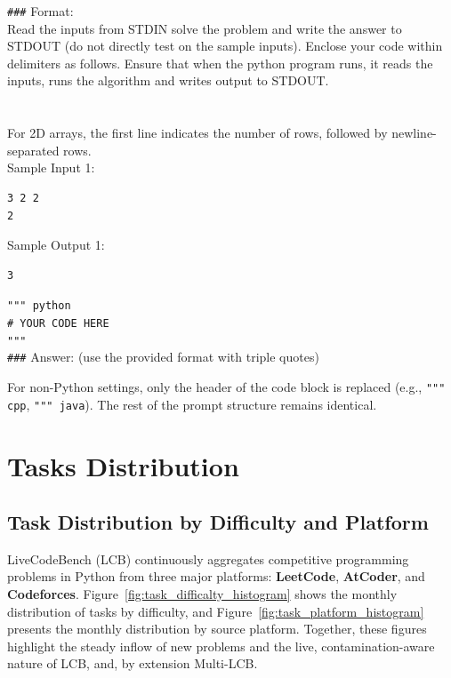 \documentclass{llmxive}
\begin{document}
\begin{addedtext}

\texttt{\#\#\#} Format: \\ 
Read the inputs from STDIN solve the problem and write the answer to STDOUT (do not directly test on the sample inputs). Enclose your code within delimiters as follows. Ensure that when the python program runs, it reads the inputs, runs the algorithm and writes output to STDOUT.\\
\\
\\
For 2D arrays, the first line indicates the number of rows, followed by newline-separated rows.  \\

Sample Input 1:  
\begin{verbatim}
3 2 2  
2  
\end{verbatim}

Sample Output 1:  
\begin{verbatim}
3  
\end{verbatim} 


\texttt{""" python } \\
\texttt{\# YOUR CODE HERE} \\
\texttt{"""} 
\\


\texttt{\#\#\#} Answer: (use the provided format with triple quotes)
\end{addedtext}

For non-Python settings, only the header of the code block is replaced (e.g., \texttt{""" cpp}, \texttt{""" java}). 
The rest of the prompt structure remains identical.


\section{Tasks Distribution}
\label{app_distribution}


\subsection{Task Distribution by Difficulty and Platform}
\label{app_subsec_platforms}

LiveCodeBench (LCB) continuously aggregates competitive programming problems in Python from three major platforms: \textbf{LeetCode}, \textbf{AtCoder}, and \textbf{Codeforces}.  
Figure~\ref{fig:task_difficalty_histogram} shows the monthly distribution of tasks by difficulty, and Figure~\ref{fig:task_platform_histogram} presents the monthly distribution by source platform.  
Together, these figures highlight the steady inflow of new problems and the live, contamination-aware nature of LCB, and, by extension Multi-LCB.
\end{document}
